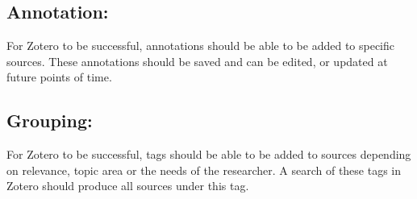 \documentclass{article}
\begin{document}
\subsection{Annotation:}
For Zotero to be successful, annotations should be able to be added to specific sources. These annotations should be saved and can be edited, or updated at future points of time. 

\subsection{Grouping:}
For Zotero to be successful, tags should be able to be added to sources depending on relevance, topic area or the needs of the researcher. A search of these tags in Zotero should produce all sources under this tag. 
\end{document}
